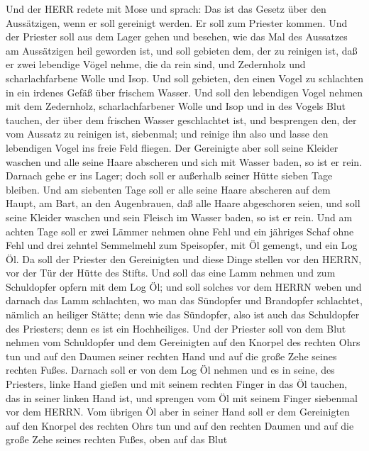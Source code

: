  Und der HERR redete mit Mose und sprach:  Das
ist das Gesetz über den Aussätzigen, wenn er soll gereinigt werden. Er
soll zum Priester kommen.  Und der Priester soll aus dem
Lager gehen und besehen, wie das Mal des Aussatzes am Aussätzigen heil
geworden ist,  und soll gebieten dem, der zu reinigen ist,
daß er zwei lebendige Vögel nehme, die da rein sind, und Zedernholz und
scharlachfarbene Wolle und Isop.  Und soll gebieten, den
einen Vogel zu schlachten in ein irdenes Gefäß über frischem Wasser.
 Und soll den lebendigen Vogel nehmen mit dem Zedernholz,
scharlachfarbener Wolle und Isop und in des Vogels Blut tauchen, der
über dem frischen Wasser geschlachtet ist,  und besprengen
den, der vom Aussatz zu reinigen ist, siebenmal; und reinige ihn also
und lasse den lebendigen Vogel ins freie Feld fliegen.  Der
Gereinigte aber soll seine Kleider waschen und alle seine Haare
abscheren und sich mit Wasser baden, so ist er rein. Darnach gehe er ins
Lager; doch soll er außerhalb seiner Hütte sieben Tage bleiben.
 Und am siebenten Tage soll er alle seine Haare abscheren
auf dem Haupt, am Bart, an den Augenbrauen, daß alle Haare abgeschoren
seien, und soll seine Kleider waschen und sein Fleisch im Wasser baden,
so ist er rein.  Und am achten Tage soll er zwei Lämmer
nehmen ohne Fehl und ein jähriges Schaf ohne Fehl und drei zehntel
Semmelmehl zum Speisopfer, mit Öl gemengt, und ein Log Öl. 
Da soll der Priester den Gereinigten und diese Dinge stellen vor den
HERRN, vor der Tür der Hütte des Stifts.  Und soll das eine
Lamm nehmen und zum Schuldopfer opfern mit dem Log Öl; und soll solches
vor dem HERRN weben  und darnach das Lamm schlachten, wo
man das Sündopfer und Brandopfer schlachtet, nämlich an heiliger Stätte;
denn wie das Sündopfer, also ist auch das Schuldopfer des Priesters;
denn es ist ein Hochheiliges.  Und der Priester soll von
dem Blut nehmen vom Schuldopfer und dem Gereinigten auf den Knorpel des
rechten Ohrs tun und auf den Daumen seiner rechten Hand und auf die
große Zehe seines rechten Fußes.  Darnach soll er von dem
Log Öl nehmen und es in seine, des Priesters, linke Hand gießen
 und mit seinem rechten Finger in das Öl tauchen, das in
seiner linken Hand ist, und sprengen vom Öl mit seinem Finger siebenmal
vor dem HERRN.  Vom übrigen Öl aber in seiner Hand soll er
dem Gereinigten auf den Knorpel des rechten Ohrs tun und auf den rechten
Daumen und auf die große Zehe seines rechten Fußes, oben auf das Blut
